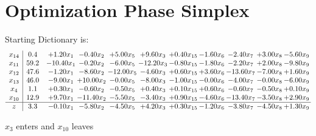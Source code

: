 \documentclass[9pt]{article}
\begin{document}
\section{Optimization Phase Simplex}
Starting Dictionary is:
\[\begin{array}{c| c c@{\hskip 2pt} c@{\hskip 2pt} c@{\hskip 2pt} c@{\hskip 2pt} c@{\hskip 2pt} c@{\hskip 2pt} c@{\hskip 2pt} c@{\hskip 2pt} c@{\hskip 2pt} }
 x_{14}   &  0.4 & +  1.20 x_{1} & -0.40 x_{2} & +  5.00 x_{5} & +  9.60 x_{3} & +  0.40 x_{15} & -1.60 x_{6} & -2.40 x_{7} & +  3.00 x_{8} & -5.60 x_{9}\\
 x_{11}   &  59.2 & -10.40 x_{1} & -0.20 x_{2} & -6.00 x_{5} & -12.20 x_{3} & -0.80 x_{15} & -1.80 x_{6} & -2.20 x_{7} & +  2.00 x_{8} & -9.80 x_{9}\\
 x_{12}   &  47.6 & -1.20 x_{1} & -8.60 x_{2} & -12.00 x_{5} & -4.60 x_{3} & +  0.60 x_{15} & +  3.60 x_{6} & -13.60 x_{7} & -7.00 x_{8} & +  1.60 x_{9}\\
 x_{13}   &  46.0 & -9.00 x_{1} & + 10.00 x_{2} & -0.00 x_{5} & -8.00 x_{3} & -1.00 x_{15} & -0.00 x_{6} & -4.00 x_{7} & -0.00 x_{8} & -6.00 x_{9}\\
 x_{4}   &  1.1 & +  0.30 x_{1} & -0.60 x_{2} & -0.50 x_{5} & +  0.40 x_{3} & +  0.10 x_{15} & +  0.60 x_{6} & -0.60 x_{7} & -0.50 x_{8} & +  0.10 x_{9}\\
 x_{10}   &  12.9 & +  9.70 x_{1} & -11.40 x_{2} & -5.50 x_{5} & -3.40 x_{3} & +  0.90 x_{15} & -4.60 x_{6} & -13.40 x_{7} & -3.50 x_{8} & +  2.90 x_{9}\\
\hline
z    &  3.3 & -0.10 x_{1} & -5.80 x_{2} & -4.50 x_{5} & +  4.20 x_{3} & +  0.30 x_{15} & -1.20 x_{6} & -3.80 x_{7} & -4.50 x_{8} & +  1.30 x_{9}\\
\end{array}\]


 $ x_{3} $ enters and $ x_{10} $ leaves 
\end{document}
